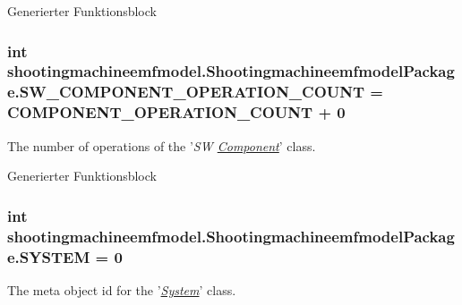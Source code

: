 Generierter Funktionsblock  \hypertarget{interfaceshootingmachineemfmodel_1_1_shootingmachineemfmodel_package_a9aa427e39341f11b62684dd213391b4b}{
\subsubsection[{S\-W\-\_\-\-C\-O\-M\-P\-O\-N\-E\-N\-T\-\_\-\-O\-P\-E\-R\-A\-T\-I\-O\-N\-\_\-\-C\-O\-U\-N\-T}]{\setlength{\rightskip}{0pt plus 5cm}int shootingmachineemfmodel.\-Shootingmachineemfmodel\-Package.\-S\-W\-\_\-\-C\-O\-M\-P\-O\-N\-E\-N\-T\-\_\-\-O\-P\-E\-R\-A\-T\-I\-O\-N\-\_\-\-C\-O\-U\-N\-T = {\bf C\-O\-M\-P\-O\-N\-E\-N\-T\-\_\-\-O\-P\-E\-R\-A\-T\-I\-O\-N\-\_\-\-C\-O\-U\-N\-T} + 0}}\label{interfaceshootingmachineemfmodel_1_1_shootingmachineemfmodel_package_a9aa427e39341f11b62684dd213391b4b}
The number of operations of the '{\itshape S\-W \hyperlink{interfaceshootingmachineemfmodel_1_1_component}{Component}}' class.

Generierter Funktionsblock  \hypertarget{interfaceshootingmachineemfmodel_1_1_shootingmachineemfmodel_package_aa429c7f8701b95480346d5662f8d5798}{
\subsubsection[{S\-Y\-S\-T\-E\-M}]{\setlength{\rightskip}{0pt plus 5cm}int shootingmachineemfmodel.\-Shootingmachineemfmodel\-Package.\-S\-Y\-S\-T\-E\-M = 0}}\label{interfaceshootingmachineemfmodel_1_1_shootingmachineemfmodel_package_aa429c7f8701b95480346d5662f8d5798}
The meta object id for the '\hyperlink{classshootingmachineemfmodel_1_1impl_1_1_system_impl}{{\itshape System}}' class.


